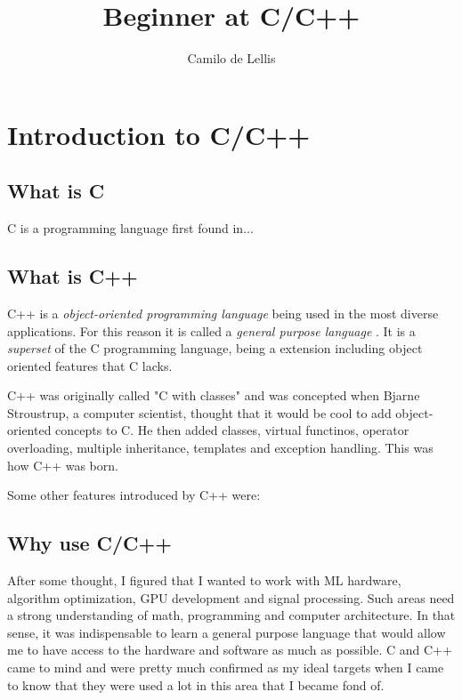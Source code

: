 \documentclass{article}
\title{Beginner at C/C++}
\author{Camilo de Lellis}
\begin{document}
\maketitle
\tableofcontents

\section{Introduction to C/C++}

\subsection{What is C}
C is a programming language first found in...

\subsection{What is C++}
C++ is a \textit{object-oriented programming language} being used in the most diverse applications. For this reason it is called a \textit{general purpose language} \cite{wikibooks_cpp}. It is a \textit{superset} of the C programming language, being a extension including object oriented features that C lacks.

C++ was originally called "C with classes" and was concepted when Bjarne Stroustrup, a computer scientist, thought that it would be cool to add object-oriented concepts to C. He then added classes, virtual functinos, operator overloading, multiple inheritance, templates and exception handling. This was how C++ was born. \cite{wikibooks_cpp}

Some other features introduced by C++ were:

\cite{wikibooks_cpp}

\subsection{Why use C/C++}

After some thought, I figured that I wanted to work with ML hardware, algorithm optimization, GPU development and signal processing. Such areas need a strong understanding of math, programming and computer architecture. In that sense, it was indispensable to learn a general purpose language that would allow me to have access to the hardware and software as much as possible. C and C++ came to mind and were pretty much confirmed as my ideal targets when I came to know that they were used a lot in this area that I became fond of. 
\end{document}
